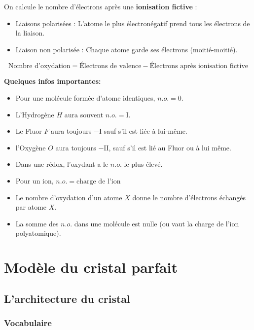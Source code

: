 \documentclass{article}
\begin{document}
On calcule le nombre d'électrons après une \textbf{ionisation fictive} :
\begin{itemize}[label=$\ast$]
    \item Liaisons polarisées : L'atome le plus électronégatif prend tous les électrons de la liaison.
    \item Liaison non polarisée : Chaque atome garde ses électrons (moitié-moitié).
\end{itemize}

$$\text{Nombre d'oxydation} = \text{Électrons de valence} - \text{Électrons après ionisation fictive}$$

\vspace{5mm}
\noindent\textbf{Quelques infos importantes:}
\begin{itemize}[label=$\ast$]
    \item Pour une molécule formée d'atome identiques, $n.o. = 0$.
    \item L'Hydrogène $H$ aura souvent $n.o. = \mathrm{I}$.
    \item Le Fluor $F$ aura toujours $-\mathrm{I}$ sauf s'il est liée à lui-même.
    \item l'Oxygène $O$ aura toujours $-\mathrm{II}$, sauf s'il est lié au Fluor ou à lui même.
    \item Dans une rédox, l'oxydant a le $n.o.$ le plus élevé.
    \item Pour un ion, $n.o. = \text{charge de l'ion}$
    \item Le nombre d'oxydation d'un atome $X$ donne le nombre d'électrons échangés par atome $X$.
    \item La somme des $n.o.$ dans une molécule est nulle (ou vaut la charge de l'ion polyatomique).
\end{itemize}


\section{Modèle du cristal parfait}\label{ch:modele-du-cristal-parfait}


\subsection{L'architecture du cristal}\label{sec:l'architecture-du-cristal}

\subsubsection{Vocabulaire}\label{subsec:vocabulaire}
\end{document}
